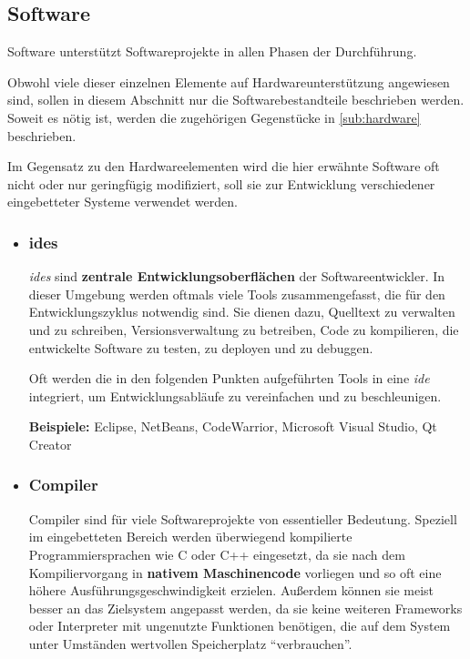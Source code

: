 \subsection{Software}\label{sub:software}
Software unterstützt Softwareprojekte in allen Phasen der Durchführung.

Obwohl viele dieser einzelnen Elemente auf Hardwareunterstützung angewiesen
sind, sollen in diesem Abschnitt nur die Softwarebestandteile beschrieben
werden. Soweit es nötig ist, werden die zugehörigen Gegenstücke in
\autoref{sub:hardware} beschrieben.

Im Gegensatz zu den Hardwareelementen wird die hier erwähnte Software oft
nicht oder nur geringfügig modifiziert, soll sie zur Entwicklung verschiedener
eingebetteter Systeme verwendet werden.
\begin{itemize}
  \item \subsubsection*{\glspl{ide}} \emph{\glspl{ide}} sind \textbf{zentrale
  Entwicklungsoberflächen} der Softwareentwickler. In dieser Umgebung werden
  oftmals viele Tools zusammengefasst, die für den Entwicklungszyklus notwendig
  sind. Sie dienen dazu, Quelltext zu verwalten und zu schreiben,
  Versionsverwaltung zu betreiben, Code zu kompilieren, die entwickelte Software
  zu testen, zu deployen und zu debuggen.
  
  Oft werden die in den folgenden Punkten aufgeführten Tools in eine
  \emph{\gls{ide}} integriert, um Entwicklungsabläufe zu vereinfachen und zu
  beschleunigen.
  
  \textbf{Beispiele:} Eclipse, NetBeans, CodeWarrior, Microsoft Visual Studio,
  Qt Creator
  \item \subsubsection*{Compiler} Compiler sind für viele Softwareprojekte von
  essentieller Bedeutung. Speziell im eingebetteten Bereich werden überwiegend
  kompilierte Programmiersprachen wie C oder C++ eingesetzt, da sie nach dem
  Kompiliervorgang in \textbf{nativem Maschinencode} vorliegen und so oft eine
  höhere Ausführungsgeschwindigkeit erzielen. Außerdem können sie meist
  besser an das Zielsystem angepasst werden, da sie keine weiteren Frameworks
  oder Interpreter mit ungenutzte Funktionen benötigen, die auf dem System
  unter Umständen wertvollen Speicherplatz "`verbrauchen"'.
  

\end{itemize}
